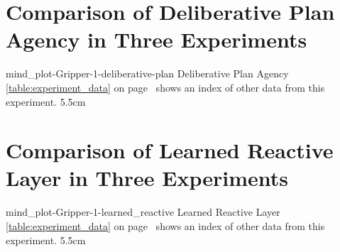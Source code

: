 {\clearpage
  \section{Comparison of Deliberative Plan Agency in Three Experiments}
  \experimentcausegroupplots{\dataappendixmaxtime}
                            {\dataappendixexperimentonemaxtime}
                            {\dataappendixexperimenttwomaxtime}
                            {\dataappendixexperimentthreemaxtime}
                            {\dataappendixexperimentonename}
                            {\dataappendixexperimenttwoname}
                            {\dataappendixexperimentthreename}
                            {\dataappendixexperimentoneprettyname}
                            {\dataappendixexperimenttwoprettyname}
                            \experimentcausegroupplotscontinued{\dataappendixexperimentthreeprettyname}
                                                               {mind_plot-Gripper-1-deliberative-plan}
                                                               {Deliberative Plan Agency}
                                                               {  {\mbox{\autoref{table:experiment_data}}} on
                                                                 {\mbox{page~\pageref{table:experiment_data}}} shows an index of other data
                                                                 from this experiment.}
                                                               {5.5cm}
}
{\clearpage
  \section{Comparison of Learned Reactive Layer in Three Experiments}
  \experimentcausegroupplots{\dataappendixmaxtime}
                            {\dataappendixexperimentonemaxtime}
                            {\dataappendixexperimenttwomaxtime}
                            {\dataappendixexperimentthreemaxtime}
                            {\dataappendixexperimentonename}
                            {\dataappendixexperimenttwoname}
                            {\dataappendixexperimentthreename}
                            {\dataappendixexperimentoneprettyname}
                            {\dataappendixexperimenttwoprettyname}
                            \experimentcausegroupplotscontinued{\dataappendixexperimentthreeprettyname}
                                                               {mind_plot-Gripper-1-learned_reactive}
                                                               {Learned Reactive Layer}
                                                               {  {\mbox{\autoref{table:experiment_data}}} on
                                                                 {\mbox{page~\pageref{table:experiment_data}}} shows an index of other data
                                                                 from this experiment.}
                                                               {5.5cm}
}

